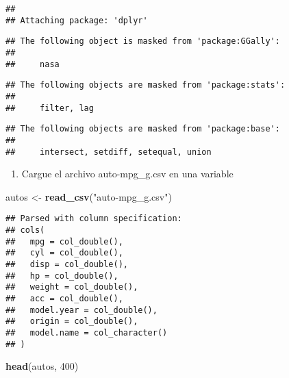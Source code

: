 \documentclass[]{article}
\newenvironment{Shaded}{\begin{snugshade}}{\end{snugshade}}
\newcommand{\DecValTok}[1]{\textcolor[rgb]{0.00,0.00,0.81}{#1}}
\newcommand{\KeywordTok}[1]{\textcolor[rgb]{0.13,0.29,0.53}{\textbf{#1}}}
\newcommand{\NormalTok}[1]{#1}
\newcommand{\StringTok}[1]{\textcolor[rgb]{0.31,0.60,0.02}{#1}}
\providecommand{\tightlist}{%
  \setlength{\itemsep}{0pt}\setlength{\parskip}{0pt}}
\begin{document}
\begin{verbatim}
## 
## Attaching package: 'dplyr'
\end{verbatim}

\begin{verbatim}
## The following object is masked from 'package:GGally':
## 
##     nasa
\end{verbatim}

\begin{verbatim}
## The following objects are masked from 'package:stats':
## 
##     filter, lag
\end{verbatim}

\begin{verbatim}
## The following objects are masked from 'package:base':
## 
##     intersect, setdiff, setequal, union
\end{verbatim}

\begin{enumerate}
\def\labelenumi{\arabic{enumi}.}
\tightlist
\item
  Cargue el archivo auto-mpg\_g.csv en una variable
\end{enumerate}

\begin{Shaded}
\begin{Highlighting}[]
\NormalTok{autos <-}\StringTok{ }\KeywordTok{read_csv}\NormalTok{(}\StringTok{"auto-mpg_g.csv"}\NormalTok{)}
\end{Highlighting}
\end{Shaded}

\begin{verbatim}
## Parsed with column specification:
## cols(
##   mpg = col_double(),
##   cyl = col_double(),
##   disp = col_double(),
##   hp = col_double(),
##   weight = col_double(),
##   acc = col_double(),
##   model.year = col_double(),
##   origin = col_double(),
##   model.name = col_character()
## )
\end{verbatim}

\begin{Shaded}
\begin{Highlighting}[]
\KeywordTok{head}\NormalTok{(autos, }\DecValTok{400}\NormalTok{)}
\end{Highlighting}
\end{Shaded}
\end{document}
